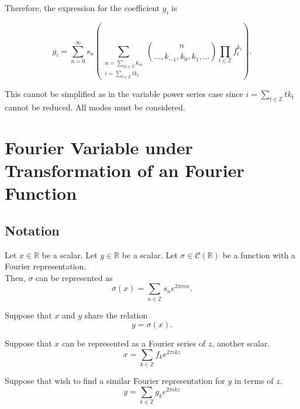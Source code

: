 \documentclass{article}
\begin{document}
    Therefore, the expression for the coefficient $g_i$ is

    \begin{equation}
        g_i = \sum_{n=0}^{\infty} s_n \left(\sum_{\substack{n = \sum_{m \in \mathbb{Z}} k_m \\ i=\sum_{t \in \mathbb{Z}} tk_t}} \binom{n}{\ldots, k_{-1}, k_{0}, k_{1}, \dots} \prod_{t \in \mathbb{Z}}f_t^{k_t} \right).
    \end{equation}

    This cannot be simplified as in the variable power series case since $i = \sum_{t \in \mathbb{Z}} tk_t$ cannot be reduced. All modes must be considered.

    \section{Fourier Variable under Transformation of an Fourier Function}

    \subsection{Notation}
    Let $x \in \mathbb{R}$ be a scalar. Let $y \in \mathbb{R}$ be a scalar. Let $\sigma \in \mathcal{C}(\mathbb{R})$ be a function with a Fourier representation.\\

    Then, $\sigma$ can be represented as
    \begin{equation}
        \sigma(x) = \sum_{n \in \mathbb{Z}} s_n e^{2 \pi i n x}.
        \label{eqn3:sigma-fourier}
    \end{equation}

    Suppose that $x$ and $y$ share the relation
    \begin{equation}
        y = \sigma(x).
        \label{eqn3:xy-relation}
    \end{equation}

    Suppose that $x$ can be represented as a Fourier series of $z$, another scalar.
    \begin{equation}
        x = \sum_{k \in \mathbb{Z}} f_k e^{2\pi i k z}
        \label{eqn3:x-fourier}
    \end{equation}

    Suppose that wish to find a similar Fourier representation for $y$ in terms of $z$.
    \begin{equation}
        y = \sum_{k \in \mathbb{Z}} g_k e^{2\pi i k z}
        \label{eqn3:y-fourier}
    \end{equation}
\end{document}
